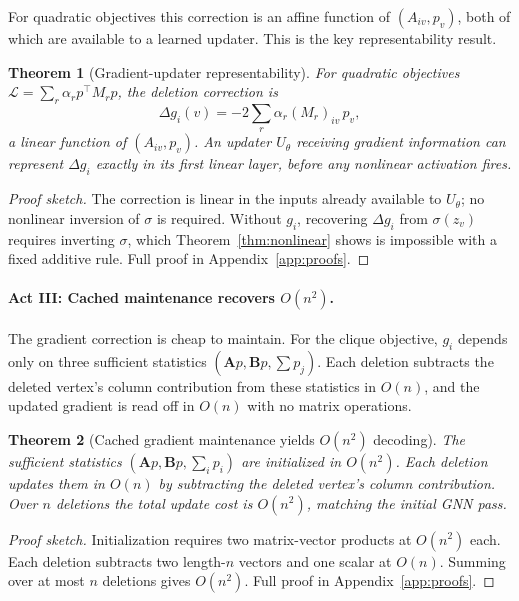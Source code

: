\documentclass[11pt]{article}
\theoremstyle{plain}
\newtheorem{theorem}{Theorem}[section]
\theoremstyle{remark}
\begin{document}
For quadratic objectives this correction is an affine function of $(A_{iv}, p_v)$,
both of which are available to a learned updater. This is the key representability
result.

\begin{theorem}[Gradient-updater representability]
  \label{thm:gu_positive}
  For quadratic objectives $\mathcal{L}=\sum_r\alpha_r p^\top M_r p$, the
  deletion correction is
  \[
    \Delta g_i(v) = -2\sum_r\alpha_r(M_r)_{iv}\,p_v,
  \]
  a linear function of $(A_{iv}, p_v)$. An updater $U_\theta$ receiving gradient
  information can represent $\Delta g_i$ exactly in its first linear layer, before
  any nonlinear activation fires.
\end{theorem}
\begin{proof}[Proof sketch]
  The correction is linear in the inputs already available to $U_\theta$; no
  nonlinear inversion of $\sigma$ is required. Without $g_i$, recovering $\Delta
  g_i$ from $\sigma(z_v)$ requires inverting $\sigma$, which
  Theorem~\ref{thm:nonlinear} shows is impossible with a fixed additive rule. Full
  proof in Appendix~\ref{app:proofs}.
\end{proof}

\paragraph{Act III: Cached maintenance recovers $O(n^2)$.}
The gradient correction is cheap to maintain. For the clique objective, $g_i$
depends only on three sufficient statistics $(\mathbf{A}p, \mathbf{B}p, \sum p_j)$.
Each deletion subtracts the deleted vertex's column contribution from these
statistics in $O(n)$, and the updated gradient is read off in $O(n)$ with no
matrix operations.

\begin{theorem}[Cached gradient maintenance yields $O(n^2)$ decoding]
  \label{thm:cached_gradient_complexity}
  The sufficient statistics $(\mathbf{A}p, \mathbf{B}p, \sum_i p_i)$ are
  initialized in $O(n^2)$. Each deletion updates them in $O(n)$ by subtracting the
  deleted vertex's column contribution. Over $n$ deletions the total update cost is
  $O(n^2)$, matching the initial GNN pass.
\end{theorem}
\begin{proof}[Proof sketch]
  Initialization requires two matrix-vector products at $O(n^2)$ each. Each
  deletion subtracts two length-$n$ vectors and one scalar at $O(n)$. Summing over
  at most $n$ deletions gives $O(n^2)$. Full proof in Appendix~\ref{app:proofs}.
\end{proof}
\end{document}

